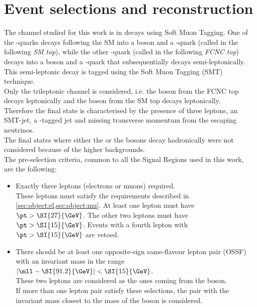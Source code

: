 \section{Event selections and reconstruction}
\label{sec:selection}
The channel studied for this work is \FCNCtZc in \ttbar decays using Soft Muon Tagging.
One of the \Pqt-quarks decays following the SM into a \PW boson and a
\Pqb-quark (called in the following \textit{SM top}), while the other
\Pqt-quark (called in the following \textit{FCNC top}) decays into a \PZ
boson and a \Pqc-quark that subsequentially decays semi-leptonically.\\
This semi-leptonic decay is tagged using the Soft Muon Tagging (SMT) technique. \\
Only the trileptonic channel is considered, i.e. the \PZ boson from the
FCNC top decays leptonically and the \PW boson from the SM top
decays leptonically.\\
Therefore the final state is characterised by the presence of three leptons, an
SMT-jet, a \Pqb-tagged jet and missing transverse momentum from the
escaping neutrinos. \\
The final states where either the \PZ or the \PW bosons decay
hadronically were not considered because of the higher backgrounds.\\
The pre-selection criteria, common to all the Signal Regions used in this work, are the following:
\begin{itemize}
	\item    Exactly three leptons (electrons or muons) required. \\
				These leptons must satisfy the requirements described in
				\cref{sec:object:el,sec:object:mu}. 
				At least one lepton must have $\pt > \SI{27}{\GeV}$. 
				The other two leptons must have $\pt > \SI{15}{\GeV}$. 
				Events with a fourth lepton with $\pt > \SI{15}{\GeV}$ are vetoed. 
	\item   There should be at least one opposite-sign same-flavour lepton pair
				(OSSF) with an invariant mass in the range 
				$|\mll - \SI{91.2}{\GeV}| < \SI{15}{\GeV}$. \\
				These two leptons are considered as the ones coming from the \PZ boson.\\ 	
				If more than one lepton pair satisfy these selections, the pair
				with the invariant mass closest to the mass of the \PZ boson is
				considered. 
\end{itemize}	

